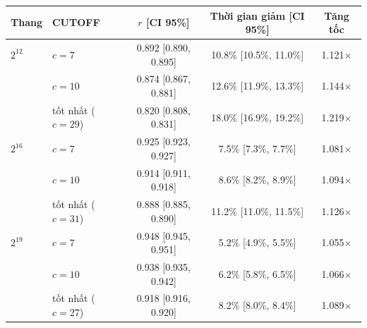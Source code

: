 \begin{tabular}{llccc}
\toprule
Thang & CUTOFF & $r$ [CI 95\%] & Thời gian giảm [CI 95\%] & Tăng tốc \\
\midrule
$2^{12}$ & $c=7$ & 0.892 [0.890, 0.895] & 10.8\% [10.5\%, 11.0\%] & 1.121$\times$ \\
 & $c=10$ & 0.874 [0.867, 0.881] & 12.6\% [11.9\%, 13.3\%] & 1.144$\times$ \\
 & tốt nhất ($c=29$) & 0.820 [0.808, 0.831] & 18.0\% [16.9\%, 19.2\%] & 1.219$\times$ \\
\addlinespace
$2^{16}$ & $c=7$ & 0.925 [0.923, 0.927] & 7.5\% [7.3\%, 7.7\%] & 1.081$\times$ \\
 & $c=10$ & 0.914 [0.911, 0.918] & 8.6\% [8.2\%, 8.9\%] & 1.094$\times$ \\
 & tốt nhất ($c=31$) & 0.888 [0.885, 0.890] & 11.2\% [11.0\%, 11.5\%] & 1.126$\times$ \\
\addlinespace
$2^{19}$ & $c=7$ & 0.948 [0.945, 0.951] & 5.2\% [4.9\%, 5.5\%] & 1.055$\times$ \\
 & $c=10$ & 0.938 [0.935, 0.942] & 6.2\% [5.8\%, 6.5\%] & 1.066$\times$ \\
 & tốt nhất ($c=27$) & 0.918 [0.916, 0.920] & 8.2\% [8.0\%, 8.4\%] & 1.089$\times$ \\
\bottomrule
\end{tabular}
